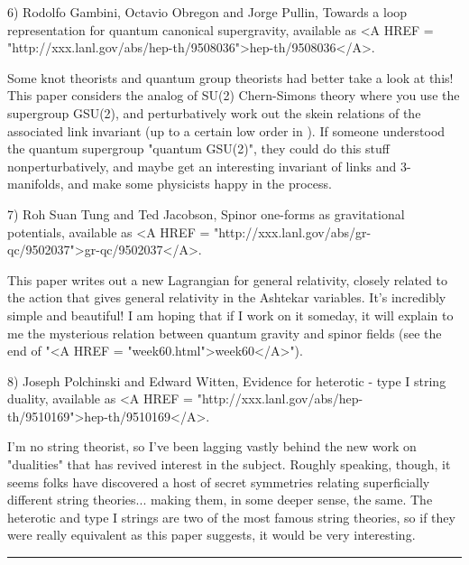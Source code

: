 6) Rodolfo Gambini, Octavio Obregon and Jorge Pullin, Towards a loop
representation for quantum canonical supergravity, available as
<A HREF = "http://xxx.lanl.gov/abs/hep-th/9508036">hep-th/9508036</A>. 

Some knot theorists and quantum group theorists had better take a look at
this!  This paper considers the analog of SU(2) Chern-Simons theory
where you use the supergroup GSU(2), and perturbatively work out the
skein relations of the associated link invariant (up to a certain low
order in \hbar ).  If someone understood the quantum supergroup "quantum
GSU(2)", they could do this stuff nonperturbatively, and maybe get an
interesting invariant of links and 3-manifolds, and make some physicists
happy in the process.

7) Roh Suan Tung and Ted Jacobson, Spinor one-forms as gravitational
potentials, available as <A HREF = "http://xxx.lanl.gov/abs/gr-qc/9502037">gr-qc/9502037</A>.

This paper writes out a new Lagrangian for general relativity, closely
related to the action that gives general relativity in the Ashtekar
variables.  It's incredibly simple and beautiful!  I am hoping that if I
work on it someday, it will explain to me the mysterious relation
between quantum gravity and spinor fields (see the end of "<A HREF = "week60.html">week60</A>").  

8) Joseph Polchinski and Edward Witten, Evidence for heterotic - type I
string duality, available as <A HREF = "http://xxx.lanl.gov/abs/hep-th/9510169">hep-th/9510169</A>.

I'm no string theorist, so I've been lagging vastly behind the new work
on "dualities" that has revived interest in the subject.  Roughly
speaking, though, it seems folks have discovered a host of secret
symmetries relating superficially different string theories... making
them, in some deeper sense, the same.  The heterotic and type I strings
are two of the most famous string theories, so if they were really
equivalent as this paper suggests, it would be very interesting.


\par\noindent\rule{\textwidth}{0.4pt}

